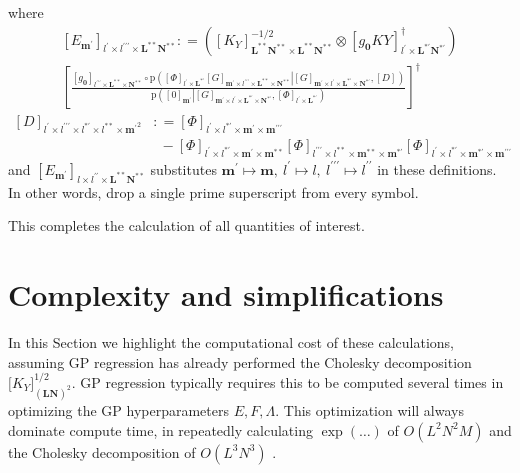 \documentclass[preprint,12pt]{elsarticle}
\newcommand*{\M}[1]{\ensuremath{#1}\xspace}
\newcommand*{\x}{\times}
\newcommand*{\mi}[1]{\mathbf{#1}}
\newcommand*{\te}[2][]{\left\lbrack{#2}\right\rbrack_{#1}}
\newcommand*{\tte}[2][]{\lbrack{#2}\rbrack_{#1}}
\newcommand*{\prob}[3]{\M{\mathrm{p}\!\left(\left.{#1}\right\vert{#2,#3}\right)}}
\newcommand*{\deq}{\M{\mathrel{\mathop:}=}}
\begin{document}
        where
        \begin{multline*}
            \te[l^{\prime}\x l^{\prime\prime\prime}\x \mi{L^{**}N^{**}}]{E_{\mi{m^{\prime}}}} \deq 
            \left(
                \te[\mi{L^{**}N^{**}}\x\mi{L^{{**}}N^{{**}}}]{K_{Y}}^{-1/2} \otimes \te[l^{\prime}\x\mi{L^{*\prime}N^{*\prime}}]{g_{\mi{0}}KY}^{\dagger} \right) \\
            \left\lbrack\frac{
            \te[l^{\prime\prime\prime}\x\mi{L^{{**}}}\x\mi{N^{{**}}}]{g_{\mi{0}}} \circ
            \prob
            {\te[l^{\prime}\x \mi{L^{*\prime}}]{\Phi} 
            \te[\mi{m^{\prime}}\x l^{\prime\prime\prime}\x \mi{L^{{**}}\x N^{{**}}}]{G}}
            {\te[\mi{m^{\prime}}\x l^{\prime}\x \mi{L^{*\prime}\x N^{*\prime}}]{G}}
            {\te[]{D}}}
            {\prob{\te[\mi{m^{\prime}}]{0}}{\te[\mi{m^{\prime}}\x l^{\prime}\x \mi{L^{*\prime}\x N^{*\prime}}]{G}}{\te[l^{\prime}\x \mi{L^{*\prime}}]{\Phi}}} \right\rbrack^{\dagger}
        \end{multline*}
        \begin{equation*}
            \begin{aligned}
                \te[l^{\prime}\x l^{\prime\prime\prime} \x l^{*\prime}\x l^{{**}}\x\mi{m^{\prime}}^{2}]{D} &\deq \te[l^{\prime}\x l^{*\prime}\x\mi{m^{\prime}}\x\mi{m^{\prime\prime\prime}}]{\Phi} \\ 
                &\phantom{:} - \te[l^{\prime}\x l^{*\prime}\x\mi{m^{\prime}}\x\mi{m^{{**}}}]{\Phi}
                \te[l^{\prime\prime\prime}\x l^{{**}}\x\mi{m^{{**}}}\x\mi{m^{*\prime}}]{\Phi}
                \te[l^{\prime}\x l^{*\prime}\x\mi{m^{*\prime}}\x\mi{m^{\prime\prime\prime}}]{\Phi}
            \end{aligned}
        \end{equation*}
        and $\te[l\x l^{\prime\prime}\x \mi{L^{**}N^{**}}]{E_{\mi{m^{\prime}}}}$ substitutes $\mi{m^{\prime}}\mapsto\mi{m},\ l^{\prime} \mapsto l,\ l^{\prime\prime\prime}\mapsto l^{\prime\prime}$ in these definitions. In other words, drop a single prime superscript from every symbol.

        This completes the calculation of all quantities of interest.

\section{Complexity and simplifications}\label{sec:Complexity}
    In this Section we highlight the computational cost of these calculations, assuming GP regression has already performed the Cholesky decomposition $\tte[\mi{(LN)}^{2}]{K_{Y}}^{1/2}$. GP regression typically requires this to be computed several times in optimizing the GP hyperparameters $E, F, \Lambda$. This optimization will always dominate compute time, in repeatedly calculating $\exp(\ldots)$ of $O(L^{2}N^{2}M)$ and the Cholesky decomposition of $O(L^{3}N^{3})$ \cite{Dai2022}. 
    
\end{document}
